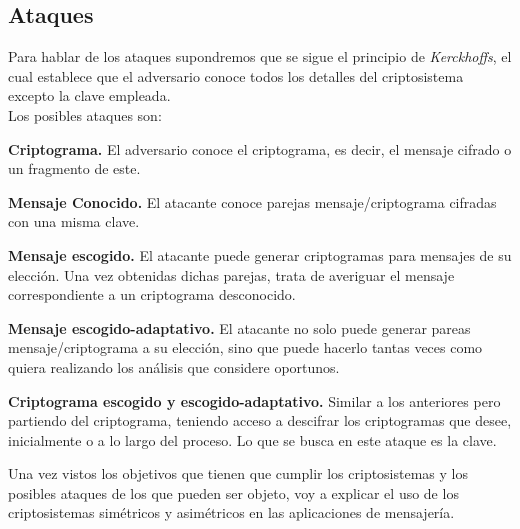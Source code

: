 \subsection{Ataques}
Para hablar de los ataques supondremos que se sigue el principio de \emph{Kerckhoffs}, el cual establece que el adversario conoce todos los detalles del criptosistema excepto la clave empleada.\\
Los posibles ataques son:
\begin{description}
		\item \textbf{Criptograma.} El adversario conoce el criptograma, es decir, el mensaje cifrado o un fragmento de este.
		\item \textbf{Mensaje Conocido.} El atacante conoce parejas mensaje/criptograma cifradas con una misma clave.
		\item \textbf{Mensaje escogido.} El atacante puede generar criptogramas para mensajes de su elección. Una vez obtenidas dichas parejas, trata de averiguar el mensaje correspondiente a un criptograma desconocido.
		\item \textbf{Mensaje escogido-adaptativo.} El atacante no solo puede generar pareas mensaje/criptograma a su elección, sino que puede hacerlo tantas veces como quiera realizando los análisis que considere oportunos.
		\item \textbf{Criptograma escogido y escogido-adaptativo.} Similar a los anteriores pero partiendo del criptograma, teniendo acceso a descifrar los criptogramas que desee, inicialmente o a lo largo del proceso. Lo que se busca en este ataque es la clave.
\end{description}

Una vez vistos los objetivos que tienen que cumplir los criptosistemas y los posibles ataques de los que pueden ser objeto, voy a explicar el uso de los criptosistemas simétricos y asimétricos en las aplicaciones de mensajería.\\

